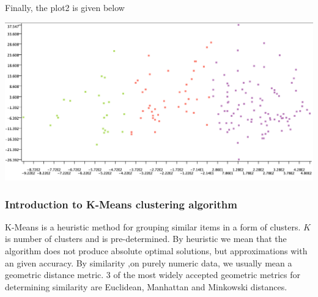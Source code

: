 \documentclass[11pt]{article}
\begin{document}
			\fi
			Finally, the plot2 is given below
			\iftrue
			\begin{center}
				\includegraphics[scale=0.5]{res/t1/t12/t12-plot2}
			\end{center}
			\fi
			\subsubsection*{Introduction to K-Means clustering algorithm}
				K-Means is a heuristic method for grouping {similar} items in a form of clusters. $K$ is number of clusters and is pre-determined. By heuristic we mean that the algorithm does not produce absolute optimal solutions, but approximations with an given accuracy. By similarity ,on purely numeric data, we usually mean a geometric distance metric. 3 of the most widely accepted geometric metrics for determining similarity are Euclidean, Manhattan and Minkowski distances.
\end{document}
